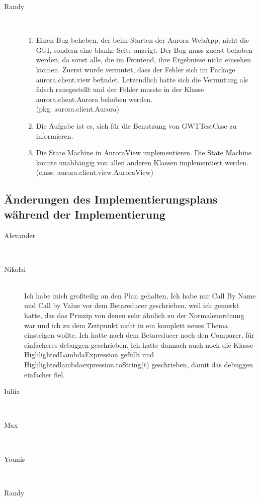 \documentclass[parskip=full,11pt,twoside]{scrartcl}
\begin{document}
\begin{description}
    \item [Randy]\hfill \\
    \begin{enumerate}
    \item Einen Bug beheben, der beim Starten der Aurora WebApp, nicht die GUI, sondern eine blanke Seite anzeigt. Der Bug muss zuerst behoben werden, da sonst alle, die im Frontend, ihre Ergebnisse nicht einsehen können. Zuerst wurde vermutet, dass der Fehler sich im Package aurora.client.view befindet. Letzendlich hatte sich die Vermutung als falsch rausgestellt und der Fehler musste in der Klasse aurora.client.Aurora behoben werden. \\(pkg: aurora.client.Aurora)
    \item Die Aufgabe ist es, sich für die Benutzung von GWTTestCase zu informieren.
    \item Die State Machine in AuroraView implementieren. Die State Machine konnte unabhängig von allen anderen Klassen implementiert werden. \\(class: aurora.client.view.AuroraView)

    \end{enumerate}
\end{description}


\subsection{Änderungen des Implementierungsplans während der Implementierung}

\begin{description}

\item [Alexander]\hfill \\
\item [Nikolai]\hfill \\
Ich habe mich großteilig an den Plan gehalten, Ich habe nur Call By Name und Call by Value vor dem Betareducer geschrieben, weil ich gemerkt hatte, das das Prinzip von denen sehr ähnlich zu der Normalenordnung war und ich zu dem Zeitpunkt nicht in ein komplett neues Thema einsteigen wollte.
Ich hatte nach dem Betareducer noch den Comparer, für einfacheres debuggen geschrieben. Ich hatte dannach auch noch die Klasse HighlightedLambdaExpression gefüllt und  Highlightedlambdaexpression.toString(t) geschrieben, damit das debuggen einfacher fiel.
\item [Iuliia]\hfill \\
\item [Max]\hfill \\
\item [Younis]\hfill \\
\item [Randy]\hfill \\
\end{description}
\end{document}
